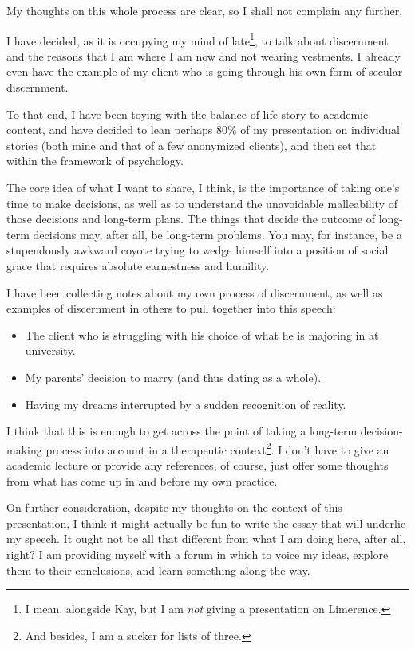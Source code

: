 My thoughts on this whole process are clear, so I shall not complain any further.

I have decided, as it is occupying my mind of late\footnote{I mean, alongside Kay, but I am \emph{not} giving a presentation on Limerence.}, to talk about discernment and the reasons that I am where I am now and not wearing vestments. I already even have the example of my client who is going through his own form of secular discernment.

To that end, I have been toying with the balance of life story to academic content, and have decided to lean perhaps 80\% of my presentation on individual stories (both mine and that of a few anonymized clients), and then set that within the framework of psychology.

The core idea of what I want to share, I think, is the importance of taking one's time to make decisions, as well as to understand the unavoidable malleability of those decisions and long-term plans. The things that decide the outcome of long-term decisions may, after all, be long-term problems. You may, for instance, be a stupendously awkward coyote trying to wedge himself into a position of social grace that requires absolute earnestness and humility.

I have been collecting notes about my own process of discernment, as well as examples of discernment in others to pull together into this speech:

\begin{itemize}
\tightlist
\item
  The client who is struggling with his choice of what he is majoring in at university.
\item
  My parents' decision to marry (and thus dating as a whole).
\item
  Having my dreams interrupted by a sudden recognition of reality.
\end{itemize}

I think that this is enough to get across the point of taking a long-term decision-making process into account in a therapeutic context\footnote{And besides, I am a sucker for lists of three.}. I don't have to give an academic lecture or provide any references, of course, just offer some thoughts from what has come up in and before my own practice.

On further consideration, despite my thoughts on the context of this presentation, I think it might actually be fun to write the essay that will underlie my speech. It ought not be all that different from what I am doing here, after all, right? I am providing myself with a forum in which to voice my ideas, explore them to their conclusions, and learn something along the way.

